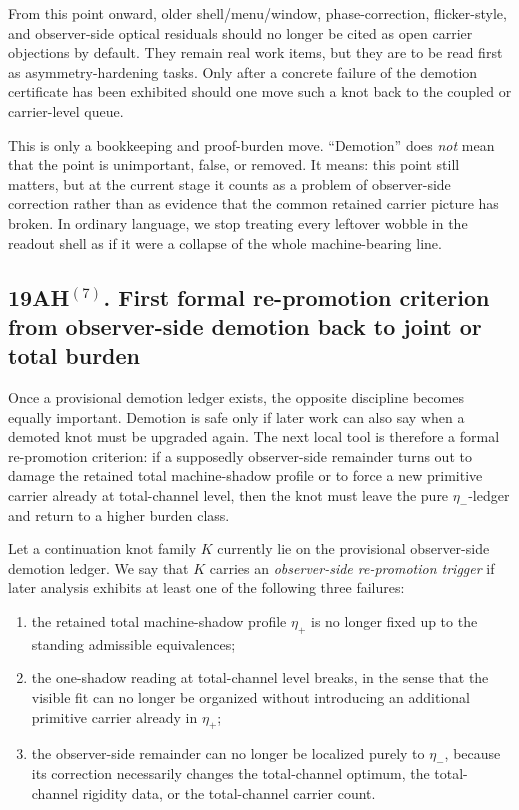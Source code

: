 \begin{corollary}
From this point onward, older shell/menu/window, phase-correction, flicker-style, and observer-side optical residuals should no longer be cited as open carrier objections by default. They remain real work items, but they are to be read first as asymmetry-hardening tasks. Only after a concrete failure of the demotion certificate has been exhibited should one move such a knot back to the coupled or carrier-level queue.
\end{corollary}

\begin{remark}
This is only a bookkeeping and proof-burden move. ``Demotion'' does \emph{not} mean that the point is unimportant, false, or removed. It means: this point still matters, but at the current stage it counts as a problem of observer-side correction rather than as evidence that the common retained carrier picture has broken. In ordinary language, we stop treating every leftover wobble in the readout shell as if it were a collapse of the whole machine-bearing line.
\end{remark}

\subsection*{19AH$^{(7)}$. First formal re-promotion criterion from observer-side demotion back to joint or total burden}
Once a provisional demotion ledger exists, the opposite discipline becomes equally important. Demotion is safe only if later work can also say when a demoted knot must be upgraded again. The next local tool is therefore a formal re-promotion criterion: if a supposedly observer-side remainder turns out to damage the retained total machine-shadow profile or to force a new primitive carrier already at total-channel level, then the knot must leave the pure \(\eta_-\)-ledger and return to a higher burden class.

\begin{definition}
Let a continuation knot family \(K\) currently lie on the provisional observer-side demotion ledger. We say that \(K\) carries an \emph{observer-side re-promotion trigger} if later analysis exhibits at least one of the following three failures:
\begin{enumerate}[leftmargin=2em]
  \item the retained total machine-shadow profile \(\eta_+\) is no longer fixed up to the standing admissible equivalences;
  \item the one-shadow reading at total-channel level breaks, in the sense that the visible fit can no longer be organized without introducing an additional primitive carrier already in \(\eta_+\);
  \item the observer-side remainder can no longer be localized purely to \(\eta_-\), because its correction necessarily changes the total-channel optimum, the total-channel rigidity data, or the total-channel carrier count.
\end{enumerate}
\end{definition}

